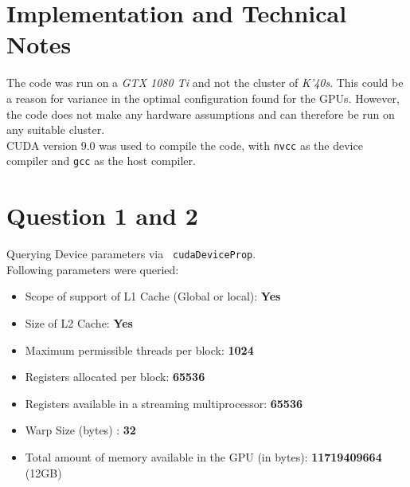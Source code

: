 \section {Implementation and Technical Notes}

The code was run on a \textit{GTX 1080 Ti} and not the cluster of \textit{K'40s}. This could be a reason for variance in the optimal configuration found for the GPUs. However, the code does not make any hardware assumptions and can therefore be run on any suitable cluster. \\

CUDA version 9.0 was used to compile the code, with \lstinline{nvcc} as the device compiler and \lstinline{gcc} as the host compiler.

\section {Question 1 and 2}

Querying Device parameters via \lstinline{ cudaDeviceProp}.\\

Following parameters were queried:
\begin{itemize}
\item Scope of support of L1 Cache (Global or local): \quad \textbf{Yes}
\item Size of L2 Cache: \quad \textbf{Yes}
\item Maximum permissible threads per block: \quad \textbf{1024}
\item Registers allocated per block: \quad \textbf{65536}
\item Registers available in a streaming multiprocessor: \quad \textbf{65536}
\item Warp Size (bytes) : \quad \textbf{32}
\item Total amount of memory available in the GPU (in bytes): \quad \textbf{11719409664} (12GB)
\end{itemize}

